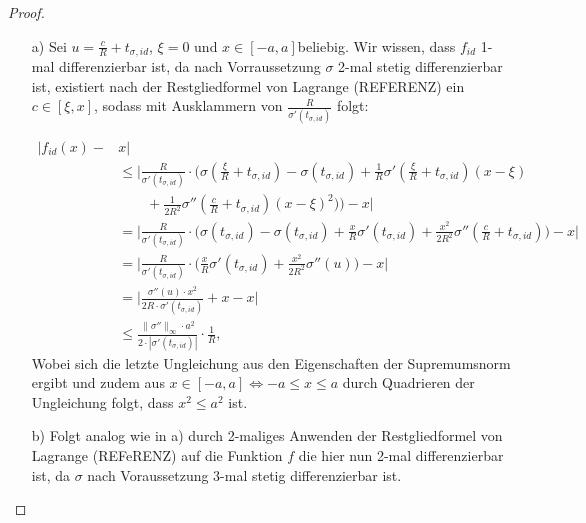 \begin{proof}
	\begin{itemize}
  	\item[a)] Sei $u = \frac{c}{R} + t_{\sigma, id}$, $\xi = 0$ und  $x \in [-a, a]$beliebig. Wir wissen, dass $f_{id}$ 1-mal differenzierbar ist, da nach Vorraussetzung $\sigma$ 2-mal stetig differenzierbar ist,  existiert nach der Restgliedformel von Lagrange (REFERENZ) ein $c \in [\xi, x] $, sodass mit Ausklammern von $\frac{R}{\sigma'(t_{\sigma, id})} $ folgt$\colon
$

  	\begin{equation*}
  	\begin{split}
  	 |f_{id}(x) -  & x| \\
  	& \leq \bigg|\frac{R}{\sigma'(t_{\sigma, id})} \cdot \bigg(\sigma\left(\frac{\xi}{R} + t_{\sigma, id}\right) - \sigma(t_{\sigma, id}) + \frac{1}{R} \sigma'\left(\frac{\xi}{R} + t_{\sigma, id}\right) (x - \xi) \\ & \qquad + \frac{1}{2R^2} \sigma''(\frac{c}{R} + t_{\sigma, id}) (x - \xi)^2)\bigg) - x \bigg| \\
  	& = \bigg|\frac{R}{\sigma'(t_{\sigma, id})} \cdot \bigg(\sigma(t_{\sigma, id}) - \sigma(t_{\sigma, id}) + \frac{x}{R} \sigma'(t_{\sigma, id}) + \frac{x^2}{2R^2} \sigma''(\frac{c}{R} + t_{\sigma, id})\bigg) - x\bigg| \\
  	& = \bigg|\frac{R}{\sigma'(t_{\sigma, id})} \cdot \bigg(\frac{x}{R} \sigma'(t_{\sigma, id}) + \frac{x^2}{2R^2}\sigma''(u)\bigg) - x\bigg| \\
  	& = \bigg| \frac{\sigma''(u) \cdot x^2}{2R \cdot \sigma'(t_{\sigma, id})} + x - x\big| \\
  	& \leq \frac{\| \sigma'' \|_{\infty} \cdot a^2}{2 \cdot |\sigma'(t_{\sigma, id})|} \cdot \frac{1}{R},  
  	\end{split}
  	\end{equation*}
  	Wobei sich die letzte Ungleichung aus den Eigenschaften der Supremumsnorm ergibt und zudem aus $x \in [-a,a] \Leftrightarrow -a \leq x \leq a$ durch Quadrieren der Ungleichung folgt, dass $x^2 \leq a^2$ ist.
  	\item[b)] Folgt analog wie in a) durch 2-maliges Anwenden der Restgliedformel von Lagrange (REFeRENZ) auf die Funktion $f$ die hier nun 2-mal differenzierbar ist, da $\sigma$ nach Voraussetzung  3-mal stetig differenzierbar ist.
 	\end{itemize}
\end{proof}


